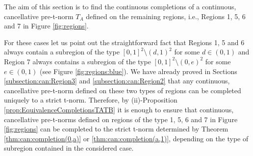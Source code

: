 The aim of this section is to find the continuous completions of a continuous, cancellative pre-t-norm $T_A$ defined on the remaining regions, i.e.,  Regions 1, 5, 6 and 7 in Figure \ref{fig:regions}.

For these cases let us point out the straightforward fact that Regions 1, 5 and 6 always contain a subregion of the type $[0,1]^2 \setminus (d,1)^2$ for some $d \in (0,1)$ and Region 7 always contains a subregion of the type $[0,1]^2 \setminus (0,e)^2$ for some $e \in (0,1)$ (see Figure \ref{fig:regions:blue}). We have already proved in Sections \ref{subsection:can:Region3} and \ref{subsection:can:Region2} that any continuous, cancellative pre-t-norm defined on these two types of regions can be completed uniquely to a strict t-norm. Therefore, by (ii)-Proposition \ref{prop:EquivalenceCompletionsTATB} it is enough to ensure that continuous, cancellative pre-t-norms defined on regions of the type 1, 5, 6 and 7 in Figure \ref{fig:regions} can be completed to the strict t-norm determined by Theorem \ref{thm:can:completion(0,a)} or \ref{thm:can:completion(a,1)}, depending on the type of subregion contained in the considered case.

